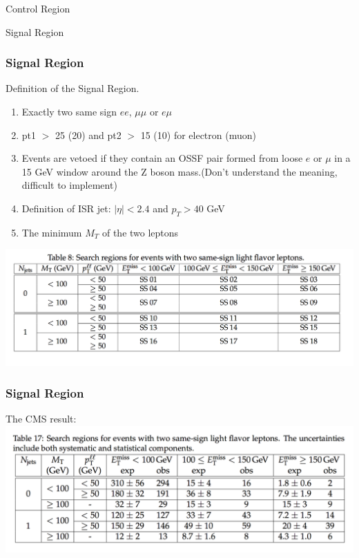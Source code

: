 \documentclass[mathserif,serif]{beamer}
\begin{document}
\begin{frame}
\begin{center}
\huge
Control Region
\end{center}
\end{frame}



\def \PathToPlot {../plot}


\begin{frame}
\begin{center}
\huge
Signal Region
\end{center}
\end{frame}

\begin{frame}
\frametitle{Signal Region}
Definition of the Signal Region.
\begin{enumerate}
\item Exactly two same sign $ee$, $\mu\mu$ or $e\mu$
\item pt1 $>$ 25 (20) and pt2 $>$ 15 (10) for electron (muon)
\item Events are vetoed if they contain an OSSF pair formed from loose $e$ or $\mu$ in a 15 GeV window around the Z boson mass.(Don't understand the meaning, difficult to implement)
\item Definition of ISR jet: $|\eta| < 2.4$ and $p_T > 40$ GeV
\item The minimum $M_T$ of the two leptons
\end{enumerate}
\includegraphics[width=1\textwidth]{data/photo/SR.png}
\end{frame}

\begin{frame}
\frametitle{Signal Region}
The CMS result:
\includegraphics[width=1\textwidth]{data/photo/result.png}
\end{frame}
\end{document}
